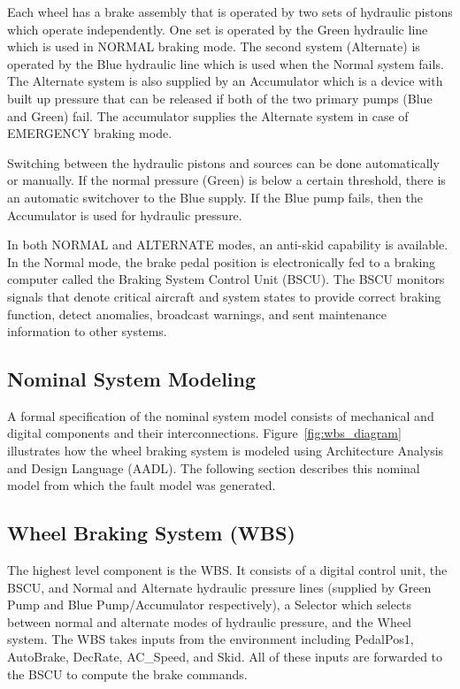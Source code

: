 Each wheel has a brake assembly that is operated by two sets of hydraulic pistons which operate independently. One set is operated by the Green hydraulic line which is used in NORMAL braking mode. The second system (Alternate) is operated by the Blue hydraulic line which is used when the Normal system fails. The Alternate system is also supplied by an Accumulator which is a device with built up pressure that can be released if both of the two primary pumps (Blue and Green) fail. The accumulator supplies the Alternate system in case of EMERGENCY braking mode. 

Switching between the hydraulic pistons and sources can be done automatically or manually. If the normal pressure (Green) is below a certain threshold, there is an automatic switchover to the Blue supply. If the Blue pump fails, then the Accumulator is used for hydraulic pressure. 

In both NORMAL and ALTERNATE modes, an anti-skid capability is available. In the Normal mode, the brake pedal position is electronically fed to a braking computer called the Braking System Control Unit (BSCU). The BSCU monitors signals that denote critical aircraft and system states to provide correct braking function, detect anomalies, broadcast warnings, and sent maintenance information to other systems. 

\subsection{Nominal System Modeling}
A formal specification of the nominal system model consists of mechanical and digital components and their interconnections. Figure~\ref{fig:wbs_diagram} illustrates how the wheel braking system is modeled using Architecture Analysis and Design Language (AADL). The following section describes this nominal model from which the fault model was generated. 

\subsection{Wheel Braking System (WBS)}
The highest level component is the WBS. It consists of a digital control unit, the BSCU, and Normal and Alternate hydraulic pressure lines (supplied by Green Pump and Blue Pump/Accumulator respectively), a Selector which selects between normal and alternate modes of hydraulic pressure, and the Wheel system. The WBS takes inputs from the environment including PedalPos1, AutoBrake, DecRate, AC_Speed, and Skid. All of these inputs are forwarded to the BSCU to compute the brake commands.

